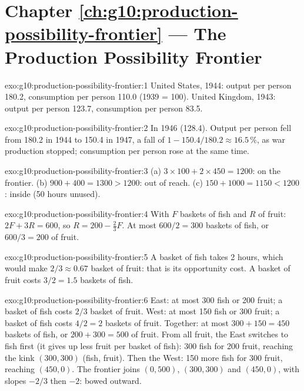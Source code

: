 \section*{Chapter \ref{ch:g10:production-possibility-frontier} --- The Production Possibility Frontier}

\begin{solution}{exo:g10:production-possibility-frontier:1}
United States, 1944: output per person 180.2, consumption per person 110.0 (1939 = 100). United
Kingdom, 1943: output per person 123.7, consumption per person 83.5.
\end{solution}

\begin{solution}{exo:g10:production-possibility-frontier:2}
In 1946 (128.4). Output per person fell from 180.2 in 1944 to 150.4 in 1947, a fall of $1 - 150.4/180.2
\approx 16.5\,\%$, as war production stopped; consumption per person rose at the same time.
\end{solution}

\begin{solution}{exo:g10:production-possibility-frontier:3}
(a) $3 \times 100 + 2 \times 450 = 1200$: on the frontier. (b) $900 + 400 = 1300 > 1200$: out of reach.
(c) $150 + 1000 = 1150 < 1200$: inside (50 hours unused).
\end{solution}

\begin{solution}{exo:g10:production-possibility-frontier:4}
With $F$ baskets of fish and $R$ of fruit: $2F + 3R = 600$, so $R = 200 - \tfrac{2}{3}F$. At most
$600/2 = 300$ baskets of fish, or $600/3 = 200$ of fruit.
\end{solution}

\begin{solution}{exo:g10:production-possibility-frontier:5}
A basket of fish takes 2 hours, which would make $2/3 \approx 0.67$ basket of fruit: that is its
opportunity cost. A basket of fruit costs $3/2 = 1.5$ baskets of fish.
\end{solution}

\begin{solution}{exo:g10:production-possibility-frontier:6}
East: at most 300 fish or 200 fruit; a basket of fish costs $2/3$ basket of fruit. West: at most 150
fish or 300 fruit; a basket of fish costs $4/2 = 2$ baskets of fruit. Together: at most $300 + 150 =
450$ baskets of fish, or $200 + 300 = 500$ of fruit. From all fruit, the East switches to fish first (it
gives up less fruit per basket of fish): 300 fish for 200 fruit, reaching the kink $(300, 300)$ (fish,
fruit). Then the West: 150 more fish for 300 fruit, reaching $(450, 0)$. The frontier joins $(0, 500)$,
$(300, 300)$ and $(450, 0)$, with slopes $-2/3$ then $-2$: bowed outward.
\end{solution}

